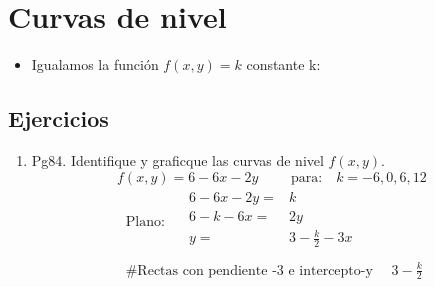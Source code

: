% 
% 

\section{Curvas de nivel}
\begin{itemize}
    \item Igualamos la función $f(x,y) = k$ constante k:
\end{itemize}



\subsection{Ejercicios}
\begin{enumerate}
    \item Pg84. Identifique y graficque las curvas de nivel $f(x,y)$.
    \newline \[
      f(x,y) = 6-6x-2y \quad \quad \text{  para:} \quad k=-6,0,6,12 
    \]
    \begin{align*}
        \text{  Plano:  } \quad \begin{matrix}
            6-6x-2y=&k \\ 
            6-k-6x=&2y \\
            y =& 3- \frac{k}{2} -3x \\ 
        \end{matrix} \\ 
        \text{  \# Rectas con pendiente -3 e intercepto-y   } \quad 3-\frac{k}{2} \\ 
    \end{align*}
\end{enumerate}































    
% 
